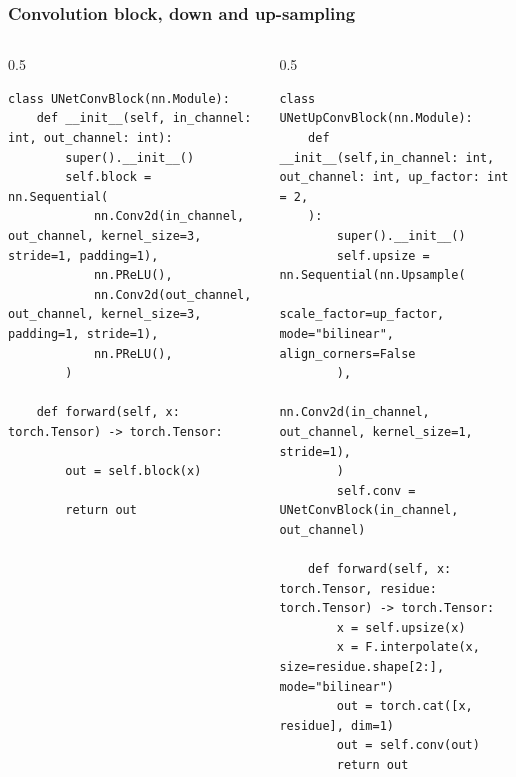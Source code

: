 \documentclass[pressentation,10pt,aspectratio=169,xcolor=table, colorlinks=true]{beamer}
\begin{document}
\begin{frame}[fragile]
  \frametitle{Convolution block, down and up-sampling}
  \begin{columns}
    \begin{column}{0.5\linewidth}
\begin{verbatim}
class UNetConvBlock(nn.Module):
    def __init__(self, in_channel: int, out_channel: int):
        super().__init__()
        self.block = nn.Sequential(
            nn.Conv2d(in_channel, out_channel, kernel_size=3, stride=1, padding=1),
            nn.PReLU(),
            nn.Conv2d(out_channel, out_channel, kernel_size=3, padding=1, stride=1),
            nn.PReLU(),
        )

    def forward(self, x: torch.Tensor) -> torch.Tensor:

        out = self.block(x)

        return out
\end{verbatim}
    \end{column}
    \begin{column}{0.5\linewidth}
      \begin{verbatim}
class UNetUpConvBlock(nn.Module):
    def __init__(self,in_channel: int, out_channel: int, up_factor: int = 2,
    ):
        super().__init__()
        self.upsize = nn.Sequential(nn.Upsample(
            scale_factor=up_factor, mode="bilinear", align_corners=False
        ),
            nn.Conv2d(in_channel, out_channel, kernel_size=1, stride=1),
        )
        self.conv = UNetConvBlock(in_channel, out_channel)

    def forward(self, x: torch.Tensor, residue: torch.Tensor) -> torch.Tensor:
        x = self.upsize(x)
        x = F.interpolate(x, size=residue.shape[2:], mode="bilinear")
        out = torch.cat([x, residue], dim=1)
        out = self.conv(out)
        return out
\end{verbatim}
    \end{column}
  \end{columns}
  
\end{frame}
\end{document}
